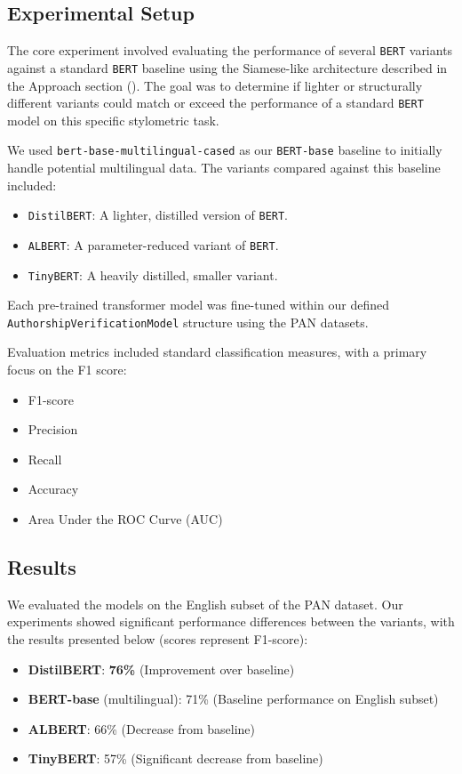 \documentclass[12pt,a4paper]{article}
\begin{document}
\subsection{Experimental Setup}
The core experiment involved evaluating the performance of several \texttt{BERT} variants against a standard \texttt{BERT} baseline using the Siamese-like architecture described in the Approach section (). The goal was to determine if lighter or structurally different variants could match or exceed the performance of a standard \texttt{BERT} model on this specific stylometric task.

We used \texttt{bert-base-multilingual-cased} as our \texttt{BERT-base} baseline to initially handle potential multilingual data. The variants compared against this baseline included:
\begin{itemize}
    \item \texttt{DistilBERT}: A lighter, distilled version of \texttt{BERT}.
    \item \texttt{ALBERT}: A parameter-reduced variant of \texttt{BERT}.
    \item \texttt{TinyBERT}: A heavily distilled, smaller variant.
\end{itemize}
Each pre-trained transformer model was fine-tuned within our defined \texttt{AuthorshipVerificationModel} structure using the PAN datasets.

Evaluation metrics included standard classification measures, with a primary focus on the F1 score:
\begin{itemize}
    \item F1-score
    \item Precision
    \item Recall
    \item Accuracy
    \item Area Under the ROC Curve (AUC)
\end{itemize}

\subsection{Results}
We evaluated the models on the English subset of the PAN dataset. Our experiments showed significant performance differences between the variants, with the results presented below (scores represent F1-score):

\begin{itemize}
    \item \textbf{DistilBERT}: \textbf{76\%} (Improvement over baseline)
    \item \textbf{BERT-base} (multilingual): 71\% (Baseline performance on English subset)
    \item \textbf{ALBERT}: 66\% (Decrease from baseline)
    \item \textbf{TinyBERT}: 57\% (Significant decrease from baseline)
\end{itemize}
\end{document}
